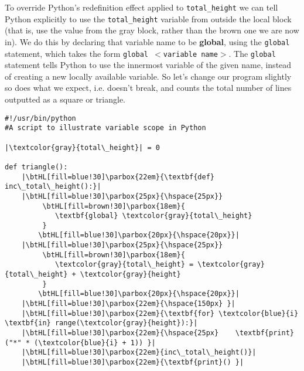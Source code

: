 To override Python's redefinition effect applied to \texttt{total\_height}   we can tell Python explicitly to use the \texttt{total\_height} variable from   outside the local block (that is, use the value from the gray block, rather than the brown one we are now in). We do this by declaring that variable name to   be \textbf{global}, using the \texttt{global} statement, which takes the   form 
\texttt{global $<$variable name$>$}. The \texttt{global} statement   tells Python to use the innermost variable of the given name, instead   of creating a new locally available variable. So let's change our   program slightly so does what we expect, i.e. doesn't break, and counts   the total number of lines outputted as a square or triangle.
\begin{lstlisting}[mathescape,escapechar=|]
#!/usr/bin/python 
#A script to illustrate variable scope in Python 

|\textcolor{gray}{total\_height}| = 0

def triangle(): 
    |\btHL[fill=blue!30]\parbox{22em}{\textbf{def} inc\_total\_height():}|
    |\btHL[fill=blue!30]\parbox{25px}{\hspace{25px}}
         \btHL[fill=brown!30]\parbox{18em}{
            \textbf{global} \textcolor{gray}{total\_height}
         }
        \btHL[fill=blue!30]\parbox{20px}{\hspace{20px}}|
    |\btHL[fill=blue!30]\parbox{25px}{\hspace{25px}}
         \btHL[fill=brown!30]\parbox{18em}{
            \textcolor{gray}{total\_height} = \textcolor{gray}{total\_height} + \textcolor{gray}{height}
         }
        \btHL[fill=blue!30]\parbox{20px}{\hspace{20px}}|
    |\btHL[fill=blue!30]\parbox{22em}{\hspace{150px} }|
    |\btHL[fill=blue!30]\parbox{22em}{\textbf{for} \textcolor{blue}{i} \textbf{in} range(\textcolor{gray}{height}):}|
    |\btHL[fill=blue!30]\parbox{22em}{\hspace{25px}    \textbf{print}("*" * (\textcolor{blue}{i} + 1)) }|
    |\btHL[fill=blue!30]\parbox{22em}{inc\_total\_height()}|
    |\btHL[fill=blue!30]\parbox{22em}{\textbf{print}() }|


\end{lstlisting}
